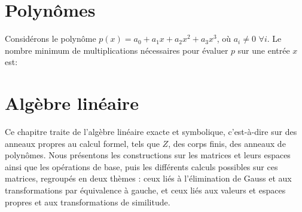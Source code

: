 \chapter{Polynômes}
\begin{exercise}
Considérons le polynôme $p(x) = a_{0} + a_{1} x + a_{2} x^{2} + a_{3} x^{3}$, où $a_{i} \neq 0$ $\forall i$. Le nombre minimum de multiplications nécessaires pour évaluer $p$ sur une entrée $x$ est:
\end{exercise}
\chapter{Algèbre linéaire}
Ce chapitre traite de l’algèbre linéaire exacte et symbolique, c’est-à-dire sur
des anneaux propres au calcul formel, tels que $Z$, des corps finis, des anneaux de
polynômes. Nous présentons les constructions sur les matrices et leurs espaces ainsi que les
opérations de base, puis les différents calculs possibles sur ces matrices, regroupés en deux thèmes : ceux liés à l’élimination de Gauss et aux transformations par équivalence à gauche, et ceux liés aux valeurs et espaces
propres et aux transformations de similitude.
